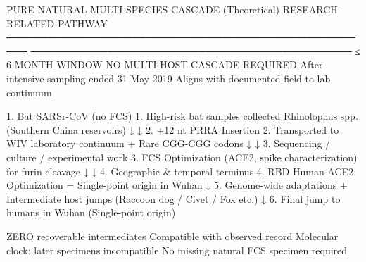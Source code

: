 PURE NATURAL MULTI-SPECIES CASCADE (Theoretical)          RESEARCH-RELATED PATHWAY
─────────────────────────────────────────────────────     ──────────────────────────────────────────────
≤ 6-MONTH WINDOW                                          NO MULTI-HOST CASCADE REQUIRED
After intensive sampling ended 31 May 2019                Aligns with documented field-to-lab continuum

1. Bat SARSr-CoV (no FCS)                                 1. High-risk bat samples collected
   Rhinolophus spp.                                          (Southern China reservoirs)
          ↓                                                        ↓
2. +12 nt PRRA Insertion                                  2. Transported to WIV laboratory continuum
   + Rare CGG-CGG codons                                           ↓
          ↓                                               3. Sequencing / culture / experimental work
3. FCS Optimization                                          (ACE2, spike characterization)
   for furin cleavage                                              ↓
          ↓                                               4. Geographic & temporal terminus
4. RBD Human-ACE2 Optimization                               = Single-point origin in Wuhan
          ↓
5. Genome-wide adaptations
   + Intermediate host jumps
   (Raccoon dog / Civet / Fox etc.)
          ↓
6. Final jump to humans in Wuhan
   (Single-point origin)

ZERO recoverable intermediates                            Compatible with observed record
Molecular clock: later specimens incompatible             No missing natural FCS specimen required
